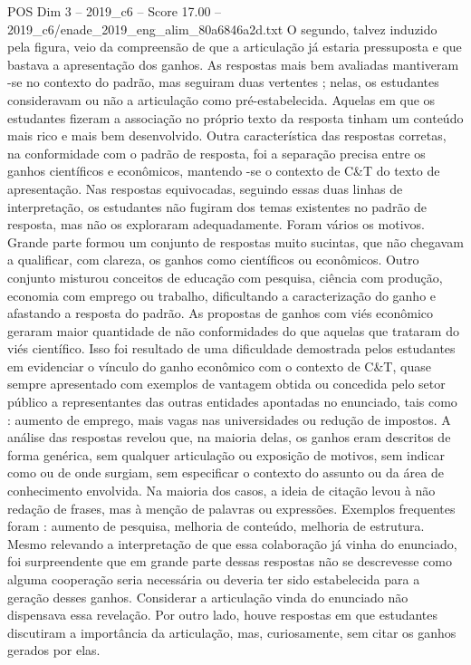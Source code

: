 \begin{textsample}{POS Dim 3 – 2019\_c6 – Score 17.00 – 2019\_c6/enade\_2019\_eng\_alim\_80a6846a2d.txt}
O segundo, talvez induzido pela figura, veio da compreensão de que a articulação já estaria pressuposta e que bastava a apresentação dos ganhos.
As respostas mais bem avaliadas mantiveram -se no contexto do padrão, mas seguiram duas vertentes ; nelas, os estudantes consideravam ou não a articulação como pré-estabelecida.
Aquelas em que os estudantes fizeram a associação no próprio texto da resposta tinham um conteúdo mais rico e mais bem desenvolvido.
Outra característica das respostas corretas, na conformidade com o padrão de resposta, foi a separação precisa entre os ganhos científicos e econômicos, mantendo -se o contexto de C\&T do texto de apresentação.
Nas respostas equivocadas, seguindo essas duas linhas de interpretação, os estudantes não fugiram dos temas existentes no padrão de resposta, mas não os exploraram adequadamente.
Foram vários os motivos.
Grande parte formou um conjunto de respostas muito sucintas, que não chegavam a qualificar, com clareza, os ganhos como científicos ou econômicos.
Outro conjunto misturou conceitos de educação com pesquisa, ciência com produção, economia com emprego ou trabalho, dificultando a caracterização do ganho e afastando a resposta do padrão.
As propostas de ganhos com viés econômico geraram maior quantidade de não conformidades do que aquelas que trataram do viés científico.
Isso foi resultado de uma dificuldade demostrada pelos estudantes em evidenciar o vínculo do ganho econômico com o contexto de C\&T, quase sempre apresentado com exemplos de vantagem obtida ou concedida pelo setor público a representantes das outras entidades apontadas no enunciado, tais como : aumento de emprego, mais vagas nas universidades ou redução de impostos.
A análise das respostas revelou que, na maioria delas, os ganhos eram descritos de forma genérica, sem qualquer articulação ou exposição de motivos, sem indicar como ou de onde surgiam, sem especificar o contexto do assunto ou da área de conhecimento envolvida.
Na maioria dos casos, a ideia de citação levou à não redação de frases, mas à menção de palavras ou expressões.
Exemplos frequentes foram : aumento de pesquisa, melhoria de conteúdo, melhoria de estrutura.
Mesmo relevando a interpretação de que essa colaboração já vinha do enunciado, foi surpreendente que em grande parte dessas respostas não se descrevesse como alguma cooperação seria necessária ou deveria ter sido estabelecida para a geração desses ganhos.
Considerar a articulação vinda do enunciado não dispensava essa revelação.
Por outro lado, houve respostas em que estudantes discutiram a importância da articulação, mas, curiosamente, sem citar os ganhos gerados por elas.

\end{textsample}
